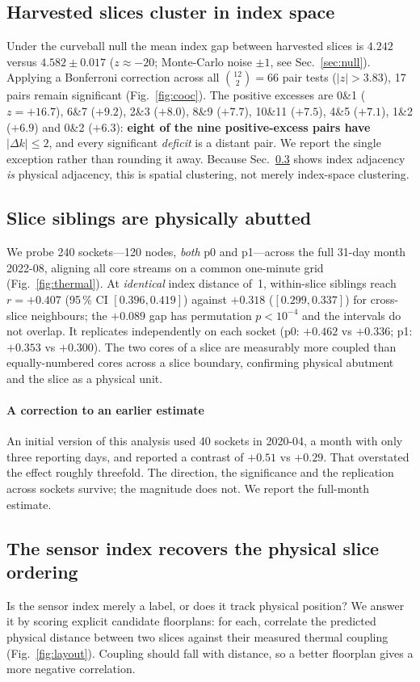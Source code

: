 \documentclass[10pt,conference]{IEEEtran}
\begin{document}
\subsection{Harvested slices cluster in index space}
\label{sec:cluster}
Under the curveball null the mean index gap between harvested slices is $4.242$ versus
$4.582\pm0.017$ ($z\approx-20$; Monte-Carlo noise $\pm1$, see Sec.~\ref{sec:null}). Applying a
Bonferroni correction across all $\binom{12}{2}=66$ pair
tests ($|z|>3.83$), 17 pairs remain significant (Fig.~\ref{fig:cooc}). The positive excesses are
0\&1 ($z=+16.7$), 6\&7 ($+9.2$), 2\&3 ($+8.0$), 8\&9 ($+7.7$), 10\&11 ($+7.5$), 4\&5 ($+7.1$),
1\&2 ($+6.9$) and 0\&2 ($+6.3$): \textbf{eight of the nine positive-excess pairs have
$|\Delta k|\le2$}, and every significant \emph{deficit} is a distant pair. We report the single
exception rather than rounding it away. Because Sec.~\ref{sec:layout} shows index adjacency
\emph{is} physical adjacency, this is spatial clustering, not merely index-space clustering.

\subsection{Slice siblings are physically abutted}
We probe 240 sockets---120 nodes, \emph{both} p0 and p1---across the full 31-day month 2022-08,
aligning all core streams on a common one-minute grid (Fig.~\ref{fig:thermal}). At
\emph{identical} index distance of~1, within-slice siblings reach $r=+0.407$
(95\,\% CI $[0.396,0.419]$) against $+0.318$ ($[0.299,0.337]$) for cross-slice neighbours;
the $+0.089$ gap has permutation $p<10^{-4}$ and the intervals do not overlap. It replicates
independently on each socket (p0: $+0.462$ vs $+0.336$; p1: $+0.353$ vs $+0.300$). The two cores of
a slice are measurably more coupled than equally-numbered cores across a slice boundary, confirming
physical abutment and the slice as a physical unit.

\paragraph*{A correction to an earlier estimate} An initial version of this analysis used 40
sockets in 2020-04, a month with only three reporting days, and reported a contrast of
$+0.51$ vs $+0.29$. That overstated the effect roughly threefold. The direction, the significance
and the replication across sockets survive; the magnitude does not. We report the full-month
estimate.

\subsection{The sensor index recovers the physical slice ordering}
\label{sec:layout}
Is the sensor index merely a label, or does it track physical position? We answer it by scoring
explicit candidate floorplans: for each, correlate the predicted physical distance between two
slices against their measured thermal coupling (Fig.~\ref{fig:layout}). Coupling should fall with
distance, so a better floorplan gives a more negative correlation.
\end{document}
